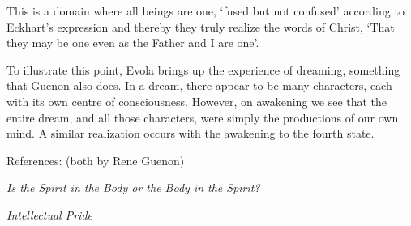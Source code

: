 \begin{quotex}
This is a domain where all beings are one, `fused but not confused' according to Eckhart's expression and thereby they truly realize the words of Christ, `That they may be one even as the Father and I are one'.
\end{quotex}


To illustrate this point, Evola brings up the experience of dreaming, something that Guenon also does. In a dream, there appear to be many characters, each with its own centre of consciousness. However, on awakening we see that the entire dream, and all those characters, were simply the productions of our own mind. A similar realization occurs with the awakening to the fourth state.

References: (both by Rene Guenon)

\textit{Is the Spirit in the Body or the Body in the Spirit?}

\textit{Intellectual Pride}



